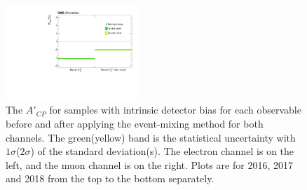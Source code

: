 \begin{figure}
    \includegraphics[width=0.45\textwidth]{figure/SimAcp_18_mu_ttbar_semi_Obs12_Acp_0_mixed_bias_0.pdf}
    \caption[The $A'_{CP}$ for samples with intrinsic detector bias for each observable.]
    {
        The $A'_{CP}$ for samples with intrinsic detector bias for each observable before and after applying the event-mixing method for both channels.
        The green(yellow) band is the statistical uncertainty with $1\sigma$($2\sigma$) of the standard deviation(s).
        The electron channel is on the left, and the muon channel is on the right.
        Plots are for 2016, 2017 and 2018 from the top to the bottom separately.
    }
    \label{fig:closure_test_acp}
\end{figure}
